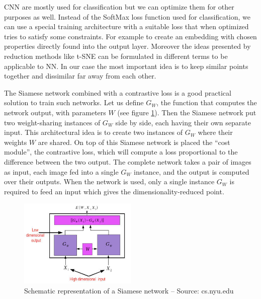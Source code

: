 \documentclass[a4paper,12pt]{report}
\begin{document}
CNN are mostly used for classification but we can optimize them for other purposes as well.
Instead of the SoftMax loss function used for classification, we can use a special training architecture with a suitable loss that when optimized tries to satisfy some constraints.
For example to create an embedding with chosen properties directly found into the output layer.
Moreover the ideas presented by reduction methods like t-SNE can be formulated in different terms to be applicable to NN.
In our case the most important idea is to keep similar points together and dissimilar far away from each other.

The Siamese network combined with a contrastive loss is a good practical solution to train such networks\cite{bromley1993signature}\cite{chopra2005learning}.
Let us define $G_W$, the function that computes the network output, with parameters $W$ (see figure \ref{fig:siamese_network}).
Then the Siamese network put two weight-sharing instances of $G_W$ side by side, each having their own separate input.
This architectural idea is to create two instances of $G_W$ where their weights $W$ are shared.
On top of this Siamese network is placed the ``cost module'', the contrastive loss, which will compute a loss proportional to the difference between the two output.
The complete network takes a pair of images as input, each image fed into a single $G_W$ instance, and the output is computed over their outputs.
When the network is used, only a single instance $G_W$ is required to feed an input which gives the dimensionality-reduced point.

\begin{figure}[h]
    \begin{center}
        \includegraphics[width=0.5\textwidth]{thesis_figures/siamese_network.jpg}
    \end{center}
    \caption{Schematic representation of a Siamese network -- Source: cs.nyu.edu}
    \label{fig:siamese_network}
\end{figure}
\end{document}
